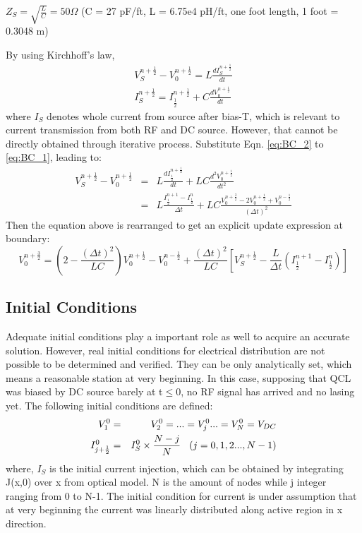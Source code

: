 \documentclass[11pt,final]{scrbook}
\begin{document}
$Z_{S}=\sqrt{\frac{L}{C}}=50\Omega$ (C = 27 pF/ft, L = 6.75e4 pH/ft, one foot length, 1 foot = 0.3048 m)

By using Kirchhoff's law, 
\begin{eqnarray}
{ V }_{ S }^{n+\frac{1}{2}}-{V}_{0}^{n+\frac{1}{2}} = L\frac{d{I}_{S}^{n+\frac{1}{2}}}{d{t}}\\\label{eq:BC_1}
{ I }_{ S }^{n+\frac{1}{2}} = { I }_{ \frac{1}{2}}^{n+\frac{1}{2}}+C\frac{d{V}_{0}^{n+\frac{1}{2}}}{d{t}}\label{eq:BC_2}
\end{eqnarray}
where ${ I }_{ S}$ denotes whole current from source after bias-T, which is relevant to current transmission from both RF and DC source. However, that cannot be directly obtained through iterative process. Substitute Eqn. \ref{eq:BC_2} to \ref{eq:BC_1}, leading to:
\begin{eqnarray}
{ V }_{ S }^{n+\frac{1}{2}}-{V}_{0}^{n+\frac{1}{2}} &=& L\frac{d{I}_{\frac{1}{2}}^{n+\frac{1}{2}}}{d{t}}+LC\frac{d^{2}{V}_{0}^{n+\frac{1}{2}}}{ dt^{2}}\\
&=& L\frac{{I}_{\frac{1}{2}}^{n+1}-{I}_{\frac{1}{2}}^{n}}{\Delta t}+LC\frac{{V}_{0}^{n+\frac{3}{2}}-2{V}_{0}^{n+\frac{1}{2}}+{V}_{0}^{n-\frac{1}{2}}}{(\Delta t)^{2}}
\end{eqnarray}
Then the equation above is rearranged to get an explicit update expression at boundary:
\begin{equation}
{ V }_{ 0 }^{ n+\frac{3}{2} } = (2-\frac{(\Delta t)^{2}}{LC}){ V }_{ 0 }^{ n+\frac{1}{2} }-{ V }_{ 0 }^{ n-\frac{1}{2} }+\frac{(\Delta t)^{2}}{LC}[V_{S}^{n+\frac{1}{2}}-\frac{L}{\Delta t}({I}_{\frac{1}{2}}^{n+1}-{I}_{\frac{1}{2}}^{n})]
\end{equation}


\subsection{Initial Conditions}
Adequate initial conditions play a important role as well to acquire an accurate solution. However, real initial conditions for electrical distribution are not possible to be determined and verified. They can be only analytically set, which means a reasonable station at very beginning. In this case, supposing that QCL was biased by DC source barely at t$\leqslant 0$, no RF signal has arrived and no lasing yet. The following initial conditions are defined:
\begin{eqnarray}
V_{1}^{0} &=& V_{2}^{0} =...=V_{j}^{0}...=V_{N}^{0} = V_{DC}\\
I_{j+\frac{1}{2}}^{0} &=& I_{S}^{0}\times \frac{N-j}{N} \hspace{3mm} (j=0,1,2...,N-1)
\end{eqnarray}
where, $I_{S}$ is the initial current injection, which can be obtained by integrating J(x,0) over x from optical model. N is the amount of nodes while j integer ranging from 0 to N-1. The initial condition for current is under assumption that at very beginning the current was linearly distributed along active region in x direction.
\end{document}
